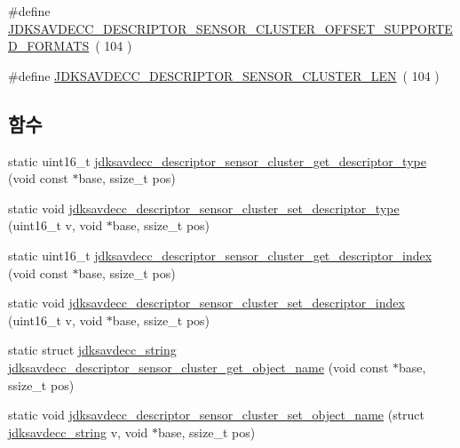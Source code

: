 \begin{DoxyCompactItemize}
\item 
\#define \hyperlink{group__descriptor__sensor__cluster_ga7289e78de7f637d091a33e4239de5015}{J\+D\+K\+S\+A\+V\+D\+E\+C\+C\+\_\+\+D\+E\+S\+C\+R\+I\+P\+T\+O\+R\+\_\+\+S\+E\+N\+S\+O\+R\+\_\+\+C\+L\+U\+S\+T\+E\+R\+\_\+\+O\+F\+F\+S\+E\+T\+\_\+\+S\+U\+P\+P\+O\+R\+T\+E\+D\+\_\+\+F\+O\+R\+M\+A\+TS}~( 104 )
\item 
\#define \hyperlink{group__descriptor__sensor__cluster_ga80124b9d585173d579cc6ed930af3be1}{J\+D\+K\+S\+A\+V\+D\+E\+C\+C\+\_\+\+D\+E\+S\+C\+R\+I\+P\+T\+O\+R\+\_\+\+S\+E\+N\+S\+O\+R\+\_\+\+C\+L\+U\+S\+T\+E\+R\+\_\+\+L\+EN}~( 104 )
\end{DoxyCompactItemize}
\subsection*{함수}
\begin{DoxyCompactItemize}
\item 
static uint16\+\_\+t \hyperlink{group__descriptor__sensor__cluster_ga5552a03d4beb49288bc8426461c958ec}{jdksavdecc\+\_\+descriptor\+\_\+sensor\+\_\+cluster\+\_\+get\+\_\+descriptor\+\_\+type} (void const $\ast$base, ssize\+\_\+t pos)
\item 
static void \hyperlink{group__descriptor__sensor__cluster_gaa1f2882e83a9356fee7f7d40f1bf44a2}{jdksavdecc\+\_\+descriptor\+\_\+sensor\+\_\+cluster\+\_\+set\+\_\+descriptor\+\_\+type} (uint16\+\_\+t v, void $\ast$base, ssize\+\_\+t pos)
\item 
static uint16\+\_\+t \hyperlink{group__descriptor__sensor__cluster_gaa892b76ea3cb78f5eb68adb2ce66f582}{jdksavdecc\+\_\+descriptor\+\_\+sensor\+\_\+cluster\+\_\+get\+\_\+descriptor\+\_\+index} (void const $\ast$base, ssize\+\_\+t pos)
\item 
static void \hyperlink{group__descriptor__sensor__cluster_ga383eeb3be514aa8dead76d8793270dc2}{jdksavdecc\+\_\+descriptor\+\_\+sensor\+\_\+cluster\+\_\+set\+\_\+descriptor\+\_\+index} (uint16\+\_\+t v, void $\ast$base, ssize\+\_\+t pos)
\item 
static struct \hyperlink{structjdksavdecc__string}{jdksavdecc\+\_\+string} \hyperlink{group__descriptor__sensor__cluster_ga8ecdee7ec40b0aebe8e97c91c4ada189}{jdksavdecc\+\_\+descriptor\+\_\+sensor\+\_\+cluster\+\_\+get\+\_\+object\+\_\+name} (void const $\ast$base, ssize\+\_\+t pos)
\item 
static void \hyperlink{group__descriptor__sensor__cluster_gacb133e379b553da032aa7d2c764d8ba2}{jdksavdecc\+\_\+descriptor\+\_\+sensor\+\_\+cluster\+\_\+set\+\_\+object\+\_\+name} (struct \hyperlink{structjdksavdecc__string}{jdksavdecc\+\_\+string} v, void $\ast$base, ssize\+\_\+t pos)

\end{DoxyCompactItemize}
